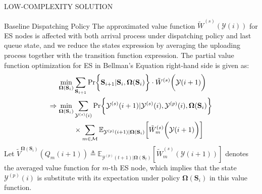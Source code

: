 \documentclass[10pt, conference, letterpaper]{IEEEtran}
\newcommand{\define}{\triangleq}
\newcommand{\leadto}{\Rightarrow}
\renewcommand{\vec}{\mathbf}
\DeclarePairedDelimiter{\set}{\{}{\}}
\DeclarePairedDelimiter{\Paren}{\bigg(}{\bigg)}
\DeclarePairedDelimiter{\Bracket}{\bigg[}{\bigg]}
\DeclarePairedDelimiter{\Brace}{\bigg\{}{\bigg\}}
\newcommand{\apSet}{\mathcal{K}}
\newcommand{\esSet}{\mathcal{M}}
\newcommand{\Stat}{\mathbf{S}}
\newcommand{\Obsv}{\mathcal{Y}}
\newcommand{\Policy}{\mathbf{\Omega}}
\begin{document}
\begin{section}{LOW-COMPLEXITY SOLUTION}
\begin{subsection}{Baseline Dispatching Policy}
            The approximated value function $\tilde{W}^{(s)}(\Obsv(i))$ for ES nodes is affected with both arrival process under dispatching policy and last queue state, and we reduce the states expression by averaging the uploading process together with the transition function expression.
            The partial value function optimization for ES in Bellman's Equation right-hand side is given as:
            \begin{align}
                \min_{\Policy(\Stat_i)}& \sum_{\Stat_{i+1}}
                    \Pr\Brace{\Stat_{i+1}|\Stat_{i}, \Policy(\Stat_i)} \cdot \tilde{W}^{(s)}\Paren{\Obsv(i+1)}
                \nonumber\\
                \leadto \min_{\Policy(\Stat_i)}& \sum_{\Obsv^{(s)}(i)}
                    \Pr\Brace{\Obsv^{(s)}(i+1)|\Obsv^{(s)}(i), \Obsv^{(p)}(i), \Policy(\Stat_i)}
                    \nonumber\\
                    & \times \sum_{m\in\esSet}
                        \mathbb{E}_{\Obsv^{(p)}(i+1)|\Policy(\Stat_i)}\Bracket{\tilde{W}^{(s)}_m\Paren{\Obsv(i+1)}}
            \end{align}
            Let $\tilde{V}^{\Policy(\Stat_i)}(Q_m(i+1)) \define \mathbb{E}_{\Obsv^{(p)}(t+1)|\Policy(\Stat_t)} [\tilde{W}^{(s)}_m(\Obsv(i+1))]$ denotes the averaged value function for $m$-th ES node, which implies that the state $\Obsv^{(p)}(i)$ is substitute with its expectation under policy $\Policy(\Stat_i)$ in this value function.


\end{subsection}
\end{section}
\end{document}
